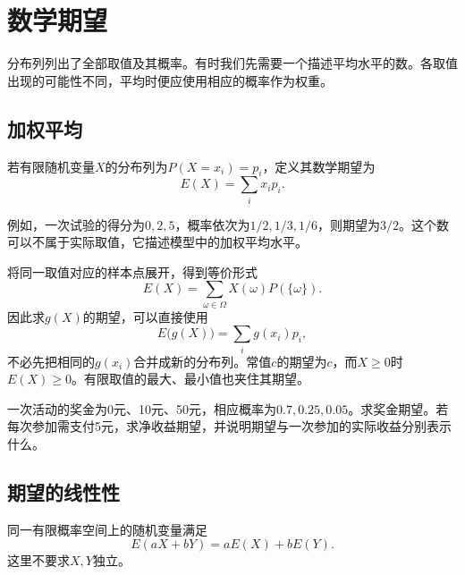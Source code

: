 \FloatBarrier
\newpage
\section{数学期望}
\label{sec:prob-expectation}

分布列列出了全部取值及其概率。有时我们先需要一个描述平均水平的数。各取值出现的可能性不同，平均时便应使用相应的概率作为权重。

\subsection{加权平均}

\begin{definition}
若有限随机变量\(X\)的分布列为\(P(X=x_i)=p_i\)，定义其{\heiti 数学期望}为
\begin{equation}\label{eq:prob-expectation}
 E(X)=\sum_i x_ip_i.
\end{equation}
\end{definition}

例如，一次试验的得分为\(0,2,5\)，概率依次为\(1/2,1/3,1/6\)，则期望为\(3/2\)。这个数可以不属于实际取值，它描述模型中的加权平均水平。

将同一取值对应的样本点展开，得到等价形式
\[
 E(X)=\sum_{\omega\in\Omega}X(\omega)P(\{\omega\}).
\]
因此求\(g(X)\)的期望，可以直接使用
\begin{equation}\label{eq:prob-expectation-function}
 E\bigl(g(X)\bigr)=\sum_i g(x_i)p_i,
\end{equation}
不必先把相同的\(g(x_i)\)合并成新的分布列。常值\(c\)的期望为\(c\)，而\(X\ge0\)时\(E(X)\ge0\)。有限取值的最大、最小值也夹住其期望。

\begin{example}
一次活动的奖金为0元、10元、50元，相应概率为\(0.7,0.25,0.05\)。求奖金期望。若每次参加需支付5元，求净收益期望，并说明期望与一次参加的实际收益分别表示什么。
\end{example}

\subsection{期望的线性性}

\begin{theorem}\label{thm:prob-linearity}
同一有限概率空间上的随机变量满足
\begin{equation}\label{eq:prob-expectation-linearity}
 E(aX+bY)=aE(X)+bE(Y).
\end{equation}
这里不要求\(X,Y\)独立。
\end{theorem}

